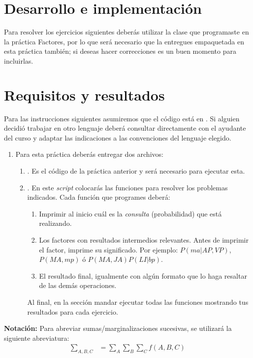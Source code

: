 \section{Desarrollo e implementación}

Para resolver los ejercicios siguientes deberás utilizar la clase que programaste en la práctica Factores, por lo que será necesario que la entregues empaquetada en esta práctica también; si deseas hacer correcciones es un buen momento para incluirlas.

\section{Requisitos y resultados}

Para las instrucciones siguientes asumiremos que el código está en .  Si alguien decidió trabajar en otro lenguaje deberá consultar directamente con el ayudante del curso y adaptar las indicaciones a las convenciones del lenguaje elegido.

\begin{enumerate}
 \item Para esta práctica deberás entregar dos archivos:
 \begin{enumerate}
  \item {}.  Es el código de la práctica anterior y será necesario para ejecutar esta.
  \item {}.  En este \textit{script} colocarás las funciones para resolver los problemas indicados.  Cada función que programes deberá:
  \begin{enumerate}
   \item Imprimir al inicio cuál es la \emph{consulta} (probabilidad) que está realizando.
   \item Los factores con resultados intermedios relevantes.  Antes de imprimir el factor, imprime su significado.  Por ejemplo: $P(ma|AP,VP)$, $P(MA,mp)$ ó $P(MA,JA)P(LI|bp)$.
   \item El resultado final, igualmente con algún formato que lo haga resaltar de las demás operaciones.
  \end{enumerate}
  Al final, en la sección  mandar ejecutar todas las funciones mostrando tus resultados para cada ejercicio.
 \end{enumerate}
\end{enumerate}

\textbf{Notación:} Para abreviar sumas/marginalizaciones sucesivas, se utilizará la siguiente abreviatura:
\begin{align*}
 \sum_{A,B,C} &= \sum_A \sum_B \sum_C f(A,B,C)
\end{align*}


